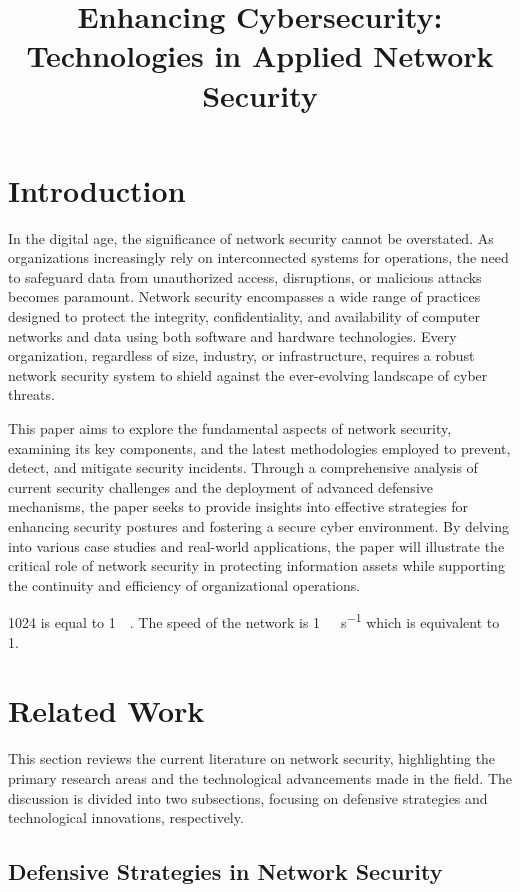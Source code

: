 \documentclass[a4paper,conference]{IEEEtran}
\title{Enhancing Cybersecurity: Technologies in Applied Network Security}
\begin{document}
\maketitle


\section{Introduction}

In the digital age, the significance of network security cannot be overstated.
As organizations increasingly rely on interconnected systems for operations, the need to safeguard data from unauthorized access, disruptions, or malicious attacks becomes paramount.
Network security encompasses a wide range of practices designed to protect the integrity, confidentiality, and availability of computer networks and data using both software and hardware technologies.
Every organization, regardless of size, industry, or infrastructure, requires a robust network security system to shield against the ever-evolving landscape of cyber threats.

This paper aims to explore the fundamental aspects of network security, examining its key components, and the latest methodologies employed to prevent, detect, and mitigate security incidents.
Through a comprehensive analysis of current security challenges and the deployment of advanced defensive mechanisms, the paper seeks to provide insights into effective strategies for enhancing security postures and fostering a secure cyber environment.
By delving into various case studies and real-world applications, the paper will illustrate the critical role of network security in protecting information assets while supporting the continuity and efficiency of organizational operations.

\SI{1024}{\byte} is equal to \SI{1}{\kilo\byte}. The speed of the network is \SI{1}{\giga\bit\per\second} which is equivalent to \SI{1}{\gbps}.

\section{Related Work}

This section reviews the current literature on network security, highlighting the primary research areas and the technological advancements made in the field.
The discussion is divided into two subsections, focusing on defensive strategies and technological innovations, respectively.

\subsection{Defensive Strategies in Network Security}
\end{document}
